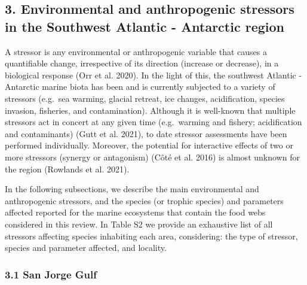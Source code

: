 \documentclass[
]{article}
\begin{document}
\normalsize

\subsection{3. Environmental and anthropogenic stressors in the
Southwest Atlantic - Antarctic
region}\label{environmental-and-anthropogenic-stressors-in-the-southwest-atlantic---antarctic-region}

A stressor is any environmental or anthropogenic variable that causes a
quantifiable change, irrespective of its direction (increase or
decrease), in a biological response (Orr et al. 2020). In the light of
this, the southwest Atlantic - Antarctic marine biota has been and is
currently subjected to a variety of stressors (e.g.~sea warming, glacial
retreat, ice changes, acidification, species invasion, fisheries, and
contamination). Although it is well-known that multiple stressors act in
concert at any given time (e.g.~warming and fishery; acidification and
contaminants) (Gutt et al. 2021), to date stressor assessments have been
performed individually. Moreover, the potential for interactive effects
of two or more stressors (synergy or antagonism) (Côté et al. 2016) is
almost unknown for the region (Rowlands et al. 2021).

In the following subsections, we describe the main environmental and
anthropogenic stressors, and the species (or trophic species) and
parameters affected reported for the marine ecosystems that contain the
food webs considered in this review. In Table S2 we provide an
exhaustive list of all stressors affecting species inhabiting each area,
considering: the type of stressor, species and parameter affected, and
locality.

\subsubsection{3.1 San Jorge Gulf}\label{san-jorge-gulf}
\end{document}

